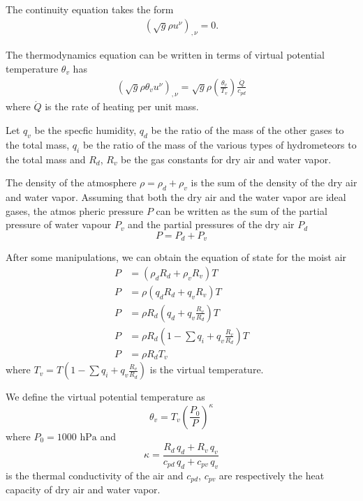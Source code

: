 \documentclass{article}
\begin{document}
The continuity equation takes the form
\begin{align}
\left( \sqrt{g}\rho u^\nu \right)_{,\nu} = 0.
\end{align}

The thermodynamics equation can be written in terms of virtual potential temperature $\theta_v$ has
\begin{align}
   \left( \sqrt{g}\rho \theta_v u^\nu \right)_{,\nu} = \sqrt{g} \rho \left( \frac{\theta_v}{T_v} \right) \frac{\dot{Q}}{c_{pd}}
\end{align}
where $\dot{Q}$ is the rate of heating per unit mass.

Let $q_v$ be the specfic humidity, $q_d$ be the ratio of the mass of the other gases to the total mass, $q_i$ be the ratio of the mass of the various types of hydrometeors to the total mass 
and $R_d$, $R_v$ be the gas constants for dry air and water vapor.


The density of the atmosphere $\rho = \rho_d + \rho_v$ is the sum of the density of the dry air and water vapor. Assuming that both the dry air and the water vapor are ideal gases, the atmos
pheric pressure $P$ can be written as the sum of the partial pressure of water vapour $P_v$ and the partial pressures of the dry air $P_d$
\begin{equation}
   P = P_d + P_v
\end{equation}

After some manipulations, we can obtain the equation of state for the moist air
\begin{align}
   P &= ( \rho_d R_d + \rho_v R_v ) T \\
   P &= \rho ( q_d R_d + q_v R_v ) T      \\
   P &= \rho R_d ( q_d + q_v \frac{R_v}{R_d} ) T      \\
   P &= \rho R_d ( 1 - \sum q_i + q_v \frac{R_v}{R_d} ) T      \\
   P &= \rho R_d T_v \label{eq:state}
\end{align}
where $T_v = T \left( 1 - \sum q_i + q_v \frac{R_v}{R_d} \right)$ is the virtual temperature.

We define the virtual potential temperature as
\begin{equation}\label{eq:pot_temp}
\theta_v = T_v  \left( \frac{P_0}{P} \right)^\kappa
\end{equation}
where $P_0 = 1000 \text{ hPa}$ and
\begin{equation}
   \kappa = \frac{R_d \, q_d + R_v \, q_v}{c_{pd} \, q_d + c_{pv} \, q_{v}}
\end{equation}
is the thermal conductivity of the air and $c_{pd}$, $c_{pv}$ are respectively the heat capacity of dry air and water vapor.
\end{document}
